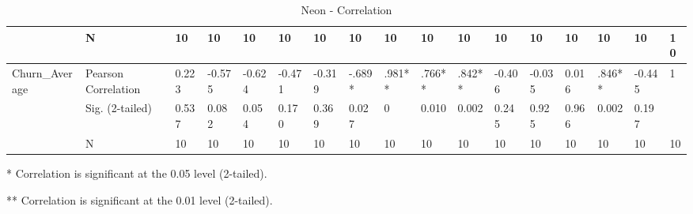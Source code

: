 \documentclass[UKenglish]{ifimaster}  %
\begin{document}
\begin{table}[!htbp]
\begin{adjustwidth}{-2.5cm}{}
{\begin{tabular}{ | l | l | l | l | l | l | l | l | l | l | l | l | l | l | l | l | l | }
	 & N & 10 & 10 & 10 & 10 & 10 & 10 & 10 & 10 & 10 & 10 & 10 & 10 & 10 & 10 & 10 \\ \hline
	Churn\_Average & Pearson Correlation & 0.223 & -0.575 & -0.624 & -0.471 & -0.319 & -.689* & .981** & .766** & .842** & -0.406 & -0.035 & 0.016 & .846** & -0.445 & 1 \\ \hline
	 & Sig. (2-tailed) & 0.537 & 0.082 & 0.054 & 0.170 & 0.369 & 0.027 & 0 & 0.010 & 0.002 & 0.245 & 0.925 & 0.966 & 0.002 & 0.197 &  \\ \hline
	 & N & 10 & 10 & 10 & 10 & 10 & 10 & 10 & 10 & 10 & 10 & 10 & 10 & 10 & 10 & 10 \\ \hline
\end{tabular}
    }
    \centerline{* Correlation is significant at the 0.05 level (2-tailed).}
    \centerline{** Correlation is significant at the 0.01 level (2-tailed).}
      \caption{Neon - Correlation}
      \end{adjustwidth}
\end{table}%
\end{document}
